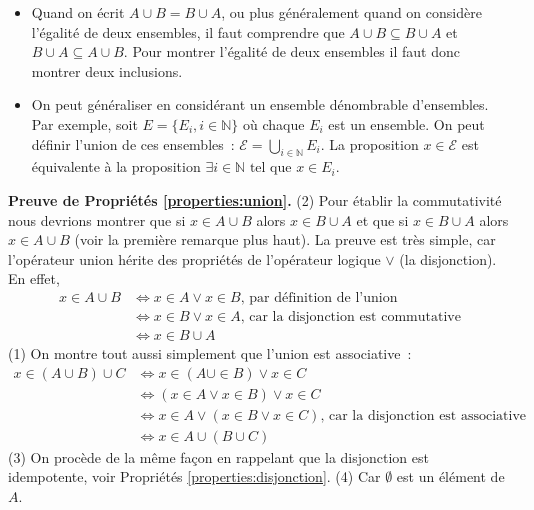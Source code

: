 \documentclass[10pt,notheorems]{beamer}
\theoremstyle{plain}
\theoremstyle{definition} %
\begin{document}
\begin{notes}
  \begin{itemize}
  \item Quand on écrit $A\cup B = B\cup A$, ou plus généralement quand on considère l'égalité de deux ensembles, il faut comprendre que $A\cup B \subseteq B\cup A$ et $B\cup A \subseteq A\cup B$. Pour montrer l'égalité de deux ensembles il faut donc montrer deux inclusions.\newline

  \item On peut généraliser en considérant un ensemble dénombrable d'ensembles. Par exemple, soit $E = \{E_i, i\in \mathbb N\}$ où chaque $E_i$ est un ensemble. On peut définir l'union de ces ensembles~: $\mathcal E = \bigcup_{i\in\mathbb N}E_i$. La proposition  $x\in\mathcal E$ est équivalente à la proposition $\exists i\in\mathbb N \text{ tel que } x\in E_i$.
  \end{itemize}

  \bigskip

  \textbf{Preuve de Propriétés \hyperlink{slide_ensembles_union}{\ref{properties:union}}.} (2) Pour établir la commutativité nous devrions montrer que si $x\in A\cup B$ alors $x\in B\cup A$ et que si $x\in B\cup A$ alors $x\in A\cup B$ (voir la première remarque plus haut). La preuve est très simple, car l'opérateur union hérite des propriétés de l'opérateur logique $\lor$ (la disjonction). En effet,
  \[
    \begin{split}
      x \in A \cup B &\Leftrightarrow x \in A \lor x\in B \text{, par définition de l'union}\\
      &\Leftrightarrow x \in B \lor x\in A \text{, car la disjonction est commutative}\\
      &\Leftrightarrow x \in B\cup A
    \end{split}
  \]
  (1) On montre tout aussi simplement que l'union est associative~:
  \[
    \begin{split}
      x \in (A\cup B)\cup C &\Leftrightarrow x \in (A \cup \in B) \lor x\in C\\
      &\Leftrightarrow (x\in A \lor x\in B) \lor x\in C\\
      &\Leftrightarrow x\in A \lor (x\in B \lor x\in C) \text{, car la disjonction est associative}\\
      &\Leftrightarrow x\in A\cup (B\cup C)
    \end{split}
  \]
  (3) On procède de la même façon en rappelant que la disjonction est idempotente, voir Propriétés \hyperlink{slide_disjonction_2}{\ref{properties:disjonction}}. (4) Car $\emptyset$ est un élément de $A$.

\end{notes}
\end{document}
